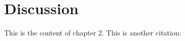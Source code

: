 \section{Discussion}

This is the content of chapter 2.
This is another citation: \cite{sahami1998bayesian}